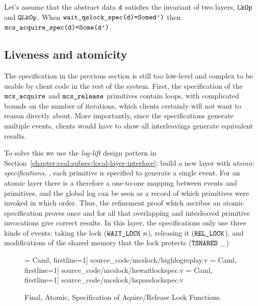 \begin{theorem} 
    Let's assume that the abstract data ${\mathrm{\texttt{d}}}$ satisfies the invariant of two layers,
    ${\mathrm{\texttt{LkOp}}}$ and ${\mathrm{\texttt{QLkOp}}}$. When 
${\mathrm{\texttt{wait\_qslock\_spec}}}{\mathrm{\texttt{(d)=}}}{\mathrm{\texttt{Some}}}{\mathrm{\texttt{d')}}}$ then 
${\mathrm{\texttt{mcs\_acquire\_spec}}}{\mathrm{\texttt{(d)=}}}{\mathrm{\texttt{Some}}}{\mathrm{\texttt{(d')}}}$.
\end{theorem}


\subsection{Liveness and atomicity}
\label{chapter:mcslock:sec:liveness-atomicity}

The specification in the previous section is still too low-level and
complex to be usable by client code in the rest of the system.  First,
the specification of the ${\mathrm{\texttt{mcs\_acquire}}}$ and
${\mathrm{\texttt{mcs\_release}}}$ primitives contain loops, with complicated
bounds on the number of iterations, which clients certainly will not
want to reason directly about.  More importantly, since the
specifications generate multiple events, clients would have to show
all interleavings generate equivalent results.

To solve this we use the \textit{log-lift} design
pattern in Section~\ref{chapter:ccal:subsec:local-layer-interface}; build a new layer with \emph{atomic specifications},
\ie, each primitive is specified to generate  a single event.
For an atomic layer there is a
therefore a one-to-one mapping between events and primitives, and the global log
can be seen as a record of which primitives were invoked in which
order. Thus, the refinement proof which ascribes an atomic
specification proves once and for all that overlapping and interleaved
primitive invocations give correct results.
In this layer, the specifications only use three kinds 
of events: taking the lock (${\mathrm{\texttt{WAIT\_LOCK}}}~{n}$),
releasing it (${\mathrm{\texttt{REL\_LOCK}}}$), and modifications of the shared
memory that the lock protects (${\mathrm{\texttt{TSHARED}}}~{\_}$)



\begin{figure}
 = Caml, firstline=1] {source_code/mcslock/highlogreplay.v}
 = Caml, firstline=1] {source_code/mcslock/hswaitlockspec.v}
 = Caml, firstline=1] {source_code/mcslock/hspasslockspec.v}
\caption{Final, Atomic, Specification of Aquire/Release Lock Functions.}
\label{fig:chapter:mcslock:hswaitlockspec}
\end{figure}

